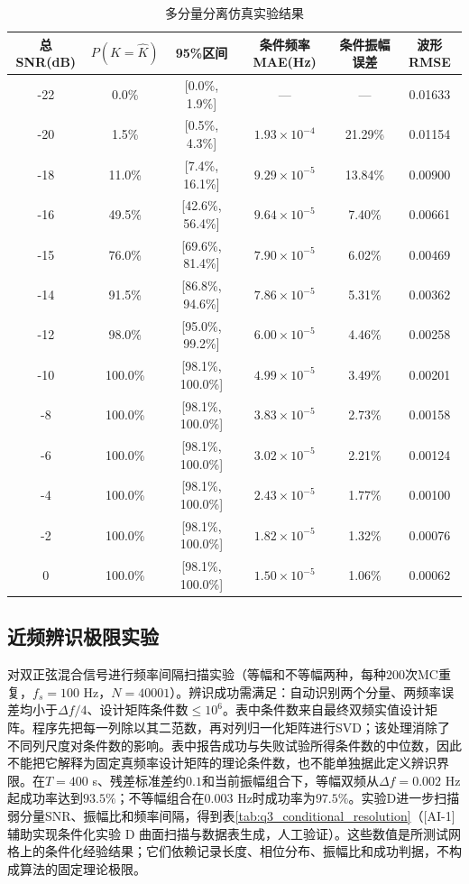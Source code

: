 \documentclass[withoutpreface,bwprint]{cumcmthesis}
\begin{document}
\small
\begin{longtable}{cccccc}
    \caption{多分量分离仿真实验结果}\label{tab:q3_sim}\\
    \toprule
    总SNR(dB) & $P(K=\hat{K})$ & 95\%区间 & 条件频率MAE(Hz) & 条件振幅误差 & 波形RMSE \\
    \midrule
    -22 & 0.0\% & [0.0\%, 1.9\%] & --- & --- & 0.01633 \\
    -20 & 1.5\% & [0.5\%, 4.3\%] & $1.93\times10^{-4}$ & 21.29\% & 0.01154 \\
    -18 & 11.0\% & [7.4\%, 16.1\%] & $9.29\times10^{-5}$ & 13.84\% & 0.00900 \\
    -16 & 49.5\% & [42.6\%, 56.4\%] & $9.64\times10^{-5}$ & 7.40\% & 0.00661 \\
    -15 & 76.0\% & [69.6\%, 81.4\%] & $7.90\times10^{-5}$ & 6.02\% & 0.00469 \\
    -14 & 91.5\% & [86.8\%, 94.6\%] & $7.86\times10^{-5}$ & 5.31\% & 0.00362 \\
    -12 & 98.0\% & [95.0\%, 99.2\%] & $6.00\times10^{-5}$ & 4.46\% & 0.00258 \\
    -10 & 100.0\% & [98.1\%, 100.0\%] & $4.99\times10^{-5}$ & 3.49\% & 0.00201 \\
    -8  & 100.0\% & [98.1\%, 100.0\%] & $3.83\times10^{-5}$ & 2.73\% & 0.00158 \\
    -6  & 100.0\% & [98.1\%, 100.0\%] & $3.02\times10^{-5}$ & 2.21\% & 0.00124 \\
    -4  & 100.0\% & [98.1\%, 100.0\%] & $2.43\times10^{-5}$ & 1.77\% & 0.00100 \\
    -2  & 100.0\% & [98.1\%, 100.0\%] & $1.82\times10^{-5}$ & 1.32\% & 0.00076 \\
    0   & 100.0\% & [98.1\%, 100.0\%] & $1.50\times10^{-5}$ & 1.06\% & 0.00062 \\
    \bottomrule
\end{longtable}
\normalsize
\FloatBarrier
\subsection{近频辨识极限实验}
对双正弦混合信号进行频率间隔扫描实验（等幅和不等幅两种，每种$200$次MC重复，$f_s=100$ Hz，$N=40001$）。辨识成功需满足：自动识别两个分量、两频率误差均小于$\Delta f/4$、设计矩阵条件数$\le10^6$。表中条件数来自最终双频实值设计矩阵。程序先把每一列除以其二范数，再对列归一化矩阵进行SVD；该处理消除了不同列尺度对条件数的影响。表中报告成功与失败试验所得条件数的中位数，因此不能把它解释为固定真频率设计矩阵的理论条件数，也不能单独据此定义辨识界限。在$T=400$ s、残差标准差约$0.1$和当前振幅组合下，等幅双频从$\Delta f=0.002$ Hz起成功率达到$93.5\%$；不等幅组合在$0.003$ Hz时成功率为$97.5\%$。实验D进一步扫描弱分量SNR、振幅比和频率间隔，得到表\ref{tab:q3_conditional_resolution}（[AI-1] 辅助实现条件化实验 D 曲面扫描与数据表生成，人工验证）。这些数值是所测试网格上的条件化经验结果；它们依赖记录长度、相位分布、振幅比和成功判据，不构成算法的固定理论极限。
\end{document}
